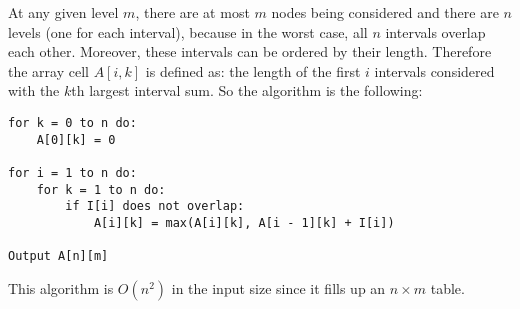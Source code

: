 \documentclass[letterpaper,notitlepage,twoside]{article}
\begin{document}
At any given level $m$, there are at most $m$ nodes being considered and there are $n$ levels (one for each interval), because in the worst case, all $n$ intervals overlap each other. Moreover, these intervals can be ordered by their length. Therefore the array cell $A[i, k]$ is defined as: the length of the first $i$ intervals considered with the $k$th largest interval sum. So the algorithm is the following:
\begin{verbatim}
for k = 0 to n do:
    A[0][k] = 0

for i = 1 to n do:
    for k = 1 to n do:
        if I[i] does not overlap:
            A[i][k] = max(A[i][k], A[i - 1][k] + I[i])

Output A[n][m]
\end{verbatim}

This algorithm is $O(n^2)$ in the input size since it fills up an $n \times m$ table.\\
\end{document}
